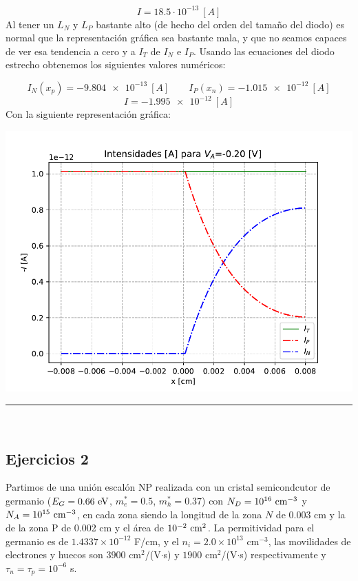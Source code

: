 \begin{enumerate}[label=\alph*)]
    \begin{equation}
        I =  18.5 \cdot 10^{-13} \ [\unit{A}]
    \end{equation}
    Al tener un $L_N$ y $L_P$ bastante alto (de hecho del orden del tamaño del diodo) es normal que la representación gráfica sea bastante mala, y que no seamos capaces de ver esa tendencia a cero y a $I_T$ de $I_N$ e $I_P$. Usando las ecuaciones del diodo estrecho obtenemos los siguientes valores numéricos: 

    \begin{equation}
        I_N(x_p)=\SI{-9.804e-13}{[A]} \qquad  
        I_P(x_n)=\SI{-1.015e-12}{[A]} 
    \end{equation}
    \begin{equation}
        I = \SI{-1.995e-12}{[A]}
    \end{equation}
    Con la siguiente representación gráfica:
    \begin{center}
    \includegraphics[width=0.6\linewidth]{Cuerpo/Ch_03/03_07_I.pdf}
    \end{center}

\end{enumerate}    

\rule{\textwidth}{0.1pt} \\[2pt]



\subsection{Ejercicios 2}

Partimos de una unión escalón NP realizada con un cristal semicondcutor de germanio ($E_G = 0.66 \ \eV$, $m_e^*=0.5$, $m_h^* = 0.37$) con $N_D=10^{16} \ \text{cm}^{-3}$ y $N_A = 10^{15} \ \text{cm}^{-3}$, en cada zona siendo la longitud de la zona $N$ de 0.003 cm y la de la zona P de 0.002 cm y el área de $10^{-2} \ \text{cm}^2$. La permitividad para el germanio es de $1.4337 \times 10^{-12}$ F/cm, y el $n_i=2.0 \times 10^{13}$ cm$^{-3}$, las movilidades de electrones y huecos son $3900$ cm$^2$/(V$\cdot$s) y $1900$ cm$^2$/(V$\cdot$s) respectivamente y $\tau_n=\tau_p=10^{-6}$ s.

